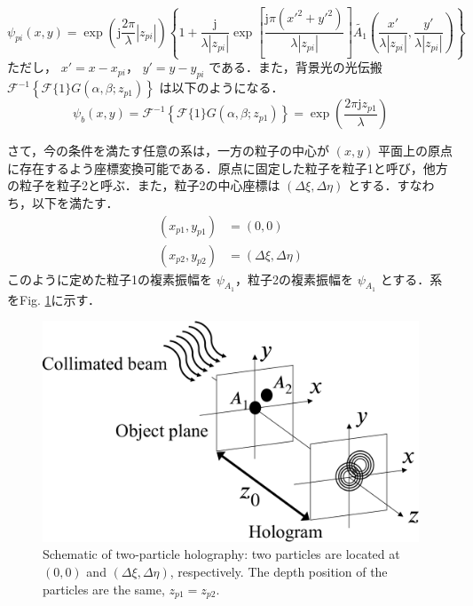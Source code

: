 \begin{equation}
    \label{th:vikramEq4.8}
    \psi_{pi}(x,y) = \exp{\left(\mathrm{j}\frac{2\pi}{\lambda}|z_{pi}|\right)} \left\{ 1 + \frac{\mathrm{j}}{\lambda |z_{pi}|} \exp{ \left[ \frac{\mathrm{j} \pi \left( x'^2 + y'^2 \right)}{\lambda |z_{pi}|} \right]} \tilde{A_1} \left(\frac{x'}{\lambda |z_{pi}|},\frac{y'}{\lambda |z_{pi}|} \right)  \right\}
\end{equation}
ただし， $x' = x- x_{pi}$， $y' = y-y_{pi}$ である．また，背景光の光伝搬 $\mathcal{F}^{-1}\left\{ \mathcal{F}\{1\}G(\alpha,\beta;z_{p1}) \right\}$ は以下のようになる．
\begin{equation}
    \psi_b(x,y) = \mathcal{F}^{-1}\left\{ \mathcal{F}\{1\}G(\alpha,\beta;z_{p1}) \right\} = \exp{\left(\frac{2\pi \mathrm{j}z_{p1}}{\lambda}\right)}
\end{equation}

さて，今の条件を満たす任意の系は，一方の粒子の中心が $(x,y)$ 平面上の原点に存在するよう座標変換可能である．原点に固定した粒子を粒子1と呼び，他方の粒子を粒子2と呼ぶ．また，粒子2の中心座標は $(\Delta \xi, \Delta \eta)$ とする．すなわち，以下を満たす．
\begin{align}
    \left( x_{p1}, y_{p1} \right) &= (0,0) \\
    \left( x_{p2}, y_{p2} \right) &= (\Delta \xi ,\Delta \eta)
\end{align}
このように定めた粒子1の複素振幅を $\psi_{A_1}$，粒子2の複素振幅を $\psi_{A_1}$ とする．系をFig. \ref{fig:twoParticleHolography}に示す．

\begin{figure}[b]
    \centering
    \includegraphics[width=0.8\linewidth]{./Figure/2_Theory/two_particle.pdf}
    \caption{Schematic of two-particle holography: two particles are located at $(0,0)$ and $(\Delta \xi, \Delta \eta)$, respectively. The depth position of the particles are the same, $z_{p1} = z_{p2}$.}
    \label{fig:twoParticleHolography}
\end{figure}

